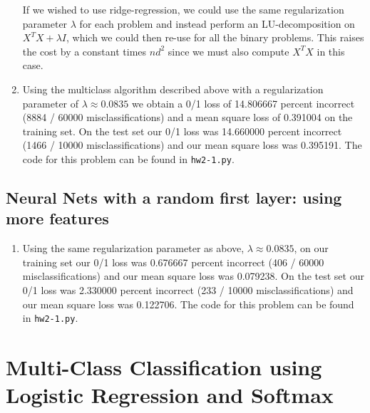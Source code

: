 \documentclass{article}
\begin{document}
\begin{enumerate}
	If we wished to use ridge-regression, we could use the same regularization parameter $\lambda$ for each problem and instead perform an LU-decomposition on $X^TX+\lambda I$, which we could then re-use for all the binary problems. This raises the cost by a constant times $nd^2$ since we must also compute $X^TX$ in this case.
	\item Using the multiclass algorithm described above with a regularization parameter of $\lambda \approx 0.0835$ we obtain a 0/1 loss of 14.806667 percent incorrect (8884 / 60000 misclassifications) and a mean square loss of 0.391004  on the training set. On the test set our 0/1 loss was 14.660000 percent incorrect (1466 / 10000 misclassifications) and our mean square loss was 0.395191. The code for this problem can be found in \texttt{hw2-1.py}.
\end{enumerate}

\pagebreak
\subsection{Neural Nets with a random first layer: using more features}
\begin{enumerate}
	\item Using the same regularization parameter as above, $\lambda \approx 0.0835$, on our training set our 0/1 loss was 0.676667 percent incorrect (406 / 60000 misclassifications) and our mean square loss was 0.079238. On the test set our 0/1 loss was 2.330000 percent incorrect (233 / 10000 misclassifications) and our mean square loss was 0.122706. The code for this problem can be found in \texttt{hw2-1.py}.
\end{enumerate}

\section{Multi-Class Classification using Logistic Regression and Softmax}
\end{document}
